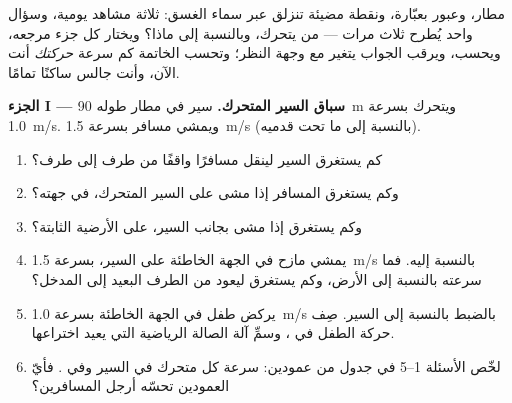 \begin{problem}
\label{pb:g10:relative-motion:1}
مطار، وعبور بعبّارة، ونقطة مضيئة تنزلق عبر سماء الغسق:
ثلاثة مشاهد يومية، وسؤال واحد يُطرح ثلاث مرات --- من
يتحرك، وبالنسبة إلى ماذا؟ ويختار كل جزء مرجعه، ويحسب،
ويرقب الجواب يتغير مع وجهة النظر؛ وتحسب الخاتمة
كم سرعة \emph{حركتك} أنت الآن، وأنت جالس ساكنًا تمامًا.

\medskip
\noindent\textbf{الجزء I --- سباق السير المتحرك.}
سير في مطار طوله \qty{90}{m} ويتحرك بسرعة \qty{1.0}{m/s}. ويمشي
مسافر بسرعة \qty{1.5}{m/s} (بالنسبة إلى ما تحت قدميه).
\begin{enumerate}
  \item كم يستغرق السير لينقل مسافرًا واقفًا
        من طرف إلى طرف؟
  \item وكم يستغرق المسافر إذا مشى على السير
        المتحرك، في جهته؟
  \item وكم يستغرق إذا مشى بجانب السير، على الأرضية الثابتة؟
  \item يمشي مازح في الجهة الخاطئة على السير، بسرعة \qty{1.5}{m/s}
        بالنسبة إليه. فما سرعته بالنسبة إلى الأرض، وكم يستغرق ليعود
        من الطرف البعيد إلى المدخل؟
  \item يركض طفل في الجهة الخاطئة بسرعة \qty{1.0}{m/s} بالضبط بالنسبة
        إلى السير. صِف حركة الطفل في ،
        وسمِّ آلة الصالة الرياضية التي يعيد اختراعها.
  \item لخّص الأسئلة 1--5 في جدول من عمودين: سرعة كل متحرك
        في  السير وفي . فأيّ العمودين
        تحسّه أرجل المسافرين؟
\end{enumerate}


\end{problem}
